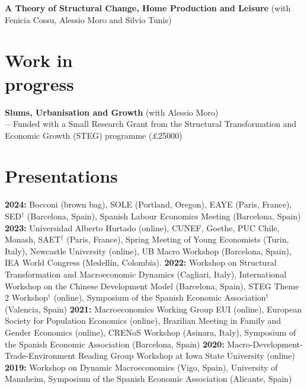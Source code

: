 \documentclass[margin]{res} %
\begin{document}
\begin{resume}

{\bf A Theory of Structural Change, Home Production and Leisure} (with Fenicia Cossu, Alessio Moro and Silvio Tunis) 

\section{Work in \\ progress}
{\bf Slums, Urbanisation and Growth} (with Alessio Moro) \\
---Funded with a Small Research Grant from the Structural Transformation and Economic Growth (STEG) programme (£25000)

\section{Presentations}

{\bf 2024:} Bocconi (brown bag), SOLE (Portland, Oregon), EAYE (Paris, France), SED$^\dagger$ (Barcelona, Spain), Spanish Labour Economics Meeting (Barcelona, Spain) {\bf 2023:} Universidad Alberto Hurtado (online), CUNEF, Goethe, PUC Chile, Monash, SAET$^\dagger$ (Paris, France), Spring Meeting of Young Economists (Turin, Italy), Newcastle University (online), UB Macro Workshop (Barcelona, Spain), IEA World Congress (Medell\'in, Colombia). {\bf 2022:} Workshop on Structural Transformation and Macroeconomic Dynamics (Cagliari, Italy), International Workshop on the Chinese Development Model (Barcelona, Spain), STEG Theme 2 Workshop$^\dagger$ (online), Symposium of the Spanish Economic Association$^\dagger$ (Valencia, Spain) {\bf 2021:} Macroeconomics Working Group EUI (online), European Society for Population Economics (online), Brazilian Meeting in Family and Gender Economics (online), CRENoS Workshop (Asinara, Italy), Symposium of the Spanish Economic Association (Barcelona, Spain) {\bf 2020:} Macro-Development-Trade-Environment Reading Group Workshop at Iowa State University (online) {\bf 2019:} Workshop on Dynamic Macroeconomics (Vigo, Spain), University of Mannheim, Symposium of the Spanish Economic Association (Alicante, Spain)


\end{resume}
\end{document}
